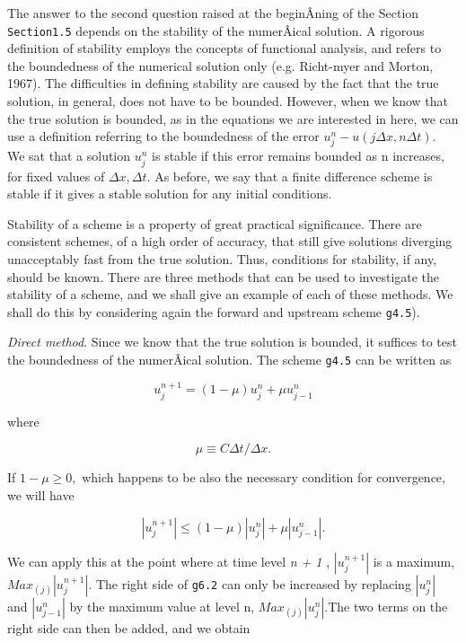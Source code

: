 The answer to the second question raised at the beginÂ­ning of the
Section \texttt{Section1.5} depends on the stability of the numerÂ­ical
solution. A rigorous definition of stability employs the concepts of
functional analysis, and refers to the boundedness of the numerical
solution only (e.g. Richt-myer and Morton, 1967). The difficulties in
defining stability are caused by the fact that the true solution, in
general, does not have to be bounded. However, when we know that the
true solution is bounded, as in the equations we are interested in here,
we can use a definition referring to the boundedness of the error
\(u_{j}^{n} - u\left( j\Delta x,n\Delta t \right)\text{. }\) We sat that
a solution \(u_{j}^{n}\) is stable if this error remains bounded as n
increases, for fixed values of \(\Delta x,\Delta t.\) As before, we say
that a finite difference scheme is stable if it gives a stable solution
for any initial conditions.

Stability of a scheme is a property of great practical significance.
There are consistent schemes, of a high order of accuracy, that still
give solutions diverging unacceptably fast from the true solution. Thus,
conditions for stability, if any, should be known. There are three
methods that can be used to investigate the stability of a scheme, and
we shall give an example of each of these methods. We shall do this by
considering again the forward and upstream scheme \texttt{g4.5}).

\emph{Direct method}. Since we know that the true solution is bounded,
it suffices to test the boundedness of the numerÂ­ical solution. The
scheme \texttt{g4.5} can be written as

{\[u_{j}^{n + 1} = \left( 1 - \mu \right)u_{j}^{n}+ \mu u_{j - 1}^{n}\]}

where

\[\mu \equiv C\Delta t/\Delta x.\]

If \(1 - \mu \geq 0,\) which happens to be also the necessary condition
for convergence, we will have

{\[\left| u_{j}^{n + 1} \right| \leq \left( 1 - \mu \right)\left| u_{j}^{n} \right| + \mu\left| u_{j - 1}^{n} \right|.\]}

We can apply this at the point where at time level \emph{n + 1} ,
\(\left| u_{j}^{n + 1} \right|\) is a maximum,
\({Max}_{(j)} \left | u_{j}^{n + 1} \right|\). The right side of
\texttt{g6.2} can only be increased by replacing
\(\left| u_{j}^{n} \right|\) and \(\left| u_{j-1}^{n} \right|\) by the
maximum value at level n, \({Max}_{(j)} \left| u_{j}^{n} \right|\).The
two terms on the right side can then be added, and we obtain

